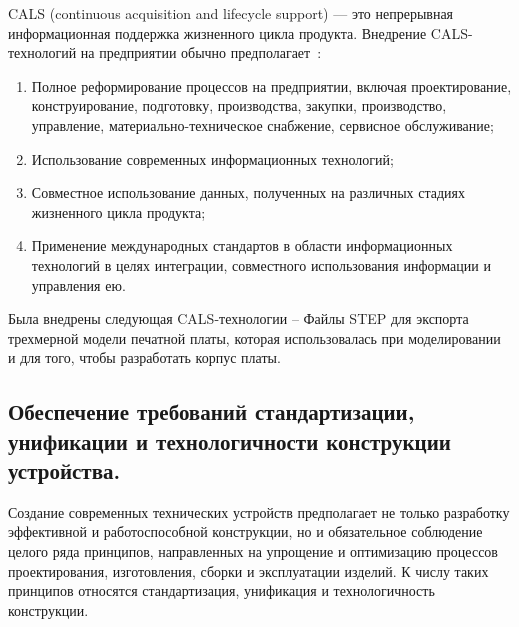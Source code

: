 CALS (continuous acquisition and lifecycle support)  — это
непрерывная информационная поддержка жизненного цикла продукта.
Внедрение CALS-технологий на предприятии обычно
предполагает~\cite{Lanin2019}:
\begin{enumerate}
\item Полное реформирование процессов на предприятии, включая
проектирование, конструирование, подготовку, производства, закупки,
производство, управление, материально-техническое снабжение, сервисное
обслуживание;

\item Использование современных информационных технологий;
  
\item Совместное использование данных, полученных на различных стадиях
  жизненного цикла продукта;
  
\item Применение международных стандартов в области информационных
технологий в целях интеграции, совместного использования информации и
управления ею.
\end{enumerate}

Была внедрены следующая CALS-технологии – Файлы STEP для экспорта
трехмерной модели печатной платы, которая использовалась при
моделировании и для того, чтобы разработать корпус платы.



\subsection{Обеспечение требований стандартизации, 
  унификации и технологичности конструкции устройства.}


Создание современных технических устройств предполагает не только
разработку эффективной и работоспособной конструкции, но и
обязательное соблюдение целого ряда принципов, направленных на
упрощение и оптимизацию процессов проектирования, изготовления, сборки
и эксплуатации изделий. К числу таких принципов относятся
стандартизация, унификация и технологичность конструкции.

